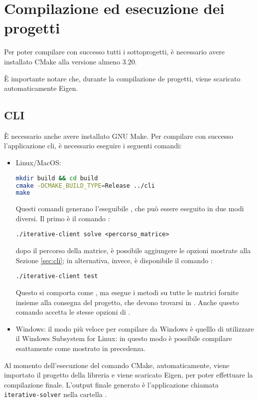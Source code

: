 	\appendix
\section{Compilazione ed esecuzione dei progetti}
Per poter compilare con successo tutti i sottoprogetti, è necessario avere installato CMake alla versione almeno 3.20.

È importante notare che, durante la compilazione de progetti, viene scaricato automaticamente Eigen.

\subsection{CLI}
È necessario anche avere installato GNU Make\cite{Make}.
Per compilare con successo l'applicazione cli, è necessario eseguire i seguenti comandi:
\begin{itemize}
	\item Linux/MacOS: 
	\begin{lstlisting}[language=Bash]
mkdir build && cd build
cmake -DCMAKE_BUILD_TYPE=Release ../cli
make \end{lstlisting}
Questi comandi generano l'eseguibile , che può essere eseguito in due modi diversi. Il primo è il comando :
\begin{lstlisting}	
./iterative-client solve <percorso_matrice>
\end{lstlisting}
dopo il percorso della matrice, è possibile aggiungere le opzioni mostrate alla Sezione \ref{sec:cli}; in alternativa, invece, è disponibile il comando :
\begin{lstlisting}
./iterative-client test
\end{lstlisting}
Questo si comporta come , ma esegue i metodi su tutte le matrici fornite insieme alla consegna del progetto, che devono trovarsi in . Anche questo comando accetta le stesse opzioni di .


\item Windows: il modo più veloce per compilare da Windows è quelllo di utilizzare il Windows Subsystem for Linux: in questo modo è possibile compilare esattamente come mostrato in precedenza.
\end{itemize} 


Al momento dell'esecuzione del comando CMake, automaticamente, viene importato il progetto della libreria e viene scaricato Eigen, per poter effettuare la compilazione finale. L'output finale generato è l'applicazione chiamata \texttt{iterative-solver} nella cartella .

